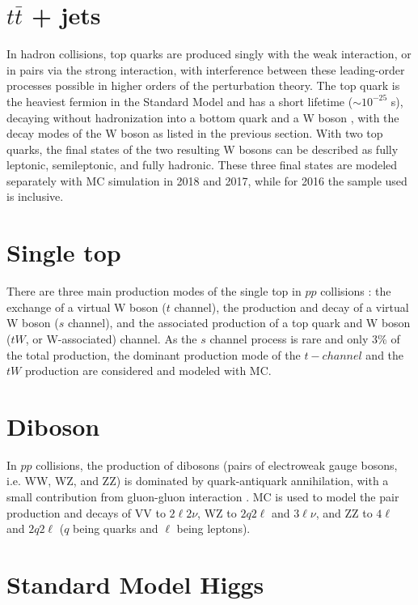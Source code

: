 \section{\texorpdfstring{$t\bar{t}$}{ttbar} + jets}
In hadron collisions, top quarks are produced singly with the weak interaction, or in pairs via the strong interaction, with interference between these leading-order processes possible in higher orders of the perturbation theory. 
The top quark is the heaviest fermion in the Standard Model and has a short lifetime ($\sim 10^{-25}$ s), decaying without hadronization into a bottom quark and a W boson \cite{workman_review_2022}, with the decay modes of the W boson as listed in the previous section. With two top quarks, the final states of the two resulting W bosons can be described as fully leptonic, semileptonic, and fully hadronic. These three final states are modeled separately with MC simulation in 2018 and 2017, while for 2016 the sample used is inclusive.

\section{Single top}
There are three main production modes of the single top in $pp$ collisions \cite{CMS-CR-2018-185}: the exchange of a virtual W boson ($t$ channel), the production and decay of a virtual W boson ($s$ channel), and the associated production of a top quark and W boson ($tW$, or W-associated) channel. As the $s$ channel process is rare and only 3\% of the total production, the dominant production mode of the $t-channel$ and the $tW$ production are considered and modeled with MC. 

\section{Diboson}

In $pp$ collisions, the production of dibosons (pairs of electroweak gauge bosons, i.e. WW, WZ, and ZZ) is dominated by quark-antiquark annihilation, with a small contribution from gluon-gluon interaction \cite{CMS-SMP-20-012}. MC is used to model the pair production and decays of VV to $2\ell 2\nu$, WZ to $2q 2\ell$ and $3 \ell \nu$, and ZZ to $4\ell$ and $2q 2\ell$ ($q$ being quarks and $\ell$ being leptons).

\section{Standard Model Higgs}

